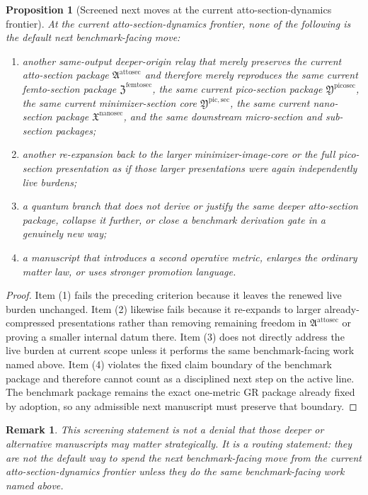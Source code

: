 \documentclass[11pt]{article}
\newcommand{\NanoSectionPackage}{\mathfrak X^{\mathrm{nanosec}}}
\newcommand{\PicoSectionPackage}{\mathfrak Y^{\mathrm{picosec}}}
\newcommand{\PicoMinSectionCore}{\mathfrak Y^{\mathrm{pic,sec}}}
\newcommand{\FemtoSectionPackage}{\mathfrak Z^{\mathrm{femtosec}}}
\newcommand{\AttoSectionPackage}{\mathfrak A^{\mathrm{attosec}}}
\newtheorem{proposition}{Proposition}
\newtheorem{remark}{Remark}
\begin{document}
\begin{proposition}[Screened next moves at the current atto-section-dynamics frontier]
At the current atto-section-dynamics frontier, none of the following is the default next benchmark-facing move:
\begin{enumerate}
    \item another same-output deeper-origin relay that merely preserves the current atto-section package \(\AttoSectionPackage\) and therefore merely reproduces the same current femto-section package \(\FemtoSectionPackage\), the same current pico-section package \(\PicoSectionPackage\), the same current minimizer-section core \(\PicoMinSectionCore\), the same current nano-section package \(\NanoSectionPackage\), and the same downstream micro-section and sub-section packages;
    \item another re-expansion back to the larger minimizer-image-core or the full pico-section presentation as if those larger presentations were again independently live burdens;
    \item a quantum branch that does not derive or justify the same deeper atto-section package, collapse it further, or close a benchmark derivation gate in a genuinely new way;
    \item a manuscript that introduces a second operative metric, enlarges the ordinary matter law, or uses stronger promotion language.
\end{enumerate}
\end{proposition}

\begin{proof}
Item (1) fails the preceding criterion because it leaves the renewed live burden unchanged. Item (2) likewise fails because it re-expands to larger already-compressed presentations rather than removing remaining freedom in \(\AttoSectionPackage\) or proving a smaller internal datum there. Item (3) does not directly address the live burden at current scope unless it performs the same benchmark-facing work named above. Item (4) violates the fixed claim boundary of the benchmark package and therefore cannot count as a disciplined next step on the active line. The benchmark package remains the exact one-metric GR package already fixed by adoption, so any admissible next manuscript must preserve that boundary.
\end{proof}

\begin{remark}
This screening statement is not a denial that those deeper or alternative manuscripts may matter strategically. It is a routing statement: they are not the default way to spend the next benchmark-facing move from the current atto-section-dynamics frontier unless they do the same benchmark-facing work named above.
\end{remark}
\end{document}
